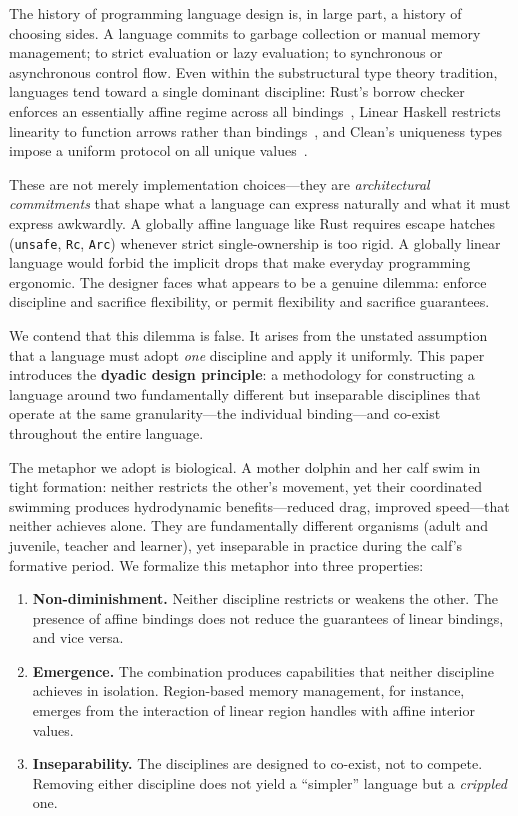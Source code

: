 \documentclass[11pt,a4paper]{article}
\begin{document}
The history of programming language design is, in large part, a history of
choosing sides. A language commits to garbage collection or manual memory
management; to strict evaluation or lazy evaluation; to synchronous or
asynchronous control flow. Even within the substructural type theory tradition,
languages tend toward a single dominant discipline: Rust's borrow checker
enforces an essentially affine regime across all bindings~\citep{jung2018rustbelt},
Linear Haskell restricts linearity to function arrows rather than
bindings~\citep{bernardy2018linear}, and Clean's uniqueness types impose a
uniform protocol on all unique values~\citep{barendsen1996uniqueness}.

These are not merely implementation choices---they are \emph{architectural
commitments} that shape what a language can express naturally and what it must
express awkwardly. A globally affine language like Rust requires escape hatches
(\lstinline{unsafe}, \lstinline{Rc}, \lstinline{Arc}) whenever strict
single-ownership is too rigid. A globally linear language would forbid the
implicit drops that make everyday programming ergonomic. The designer faces what
appears to be a genuine dilemma: enforce discipline and sacrifice flexibility,
or permit flexibility and sacrifice guarantees.

We contend that this dilemma is false. It arises from the unstated assumption
that a language must adopt \emph{one} discipline and apply it uniformly. This
paper introduces the \textbf{dyadic design principle}: a methodology for
constructing a language around two fundamentally different but inseparable
disciplines that operate at the same granularity---the individual binding---and
co-exist throughout the entire language.

The metaphor we adopt is biological. A mother dolphin and her calf swim in tight
formation: neither restricts the other's movement, yet their coordinated
swimming produces hydrodynamic benefits---reduced drag, improved speed---that
neither achieves alone. They are fundamentally different organisms (adult and
juvenile, teacher and learner), yet inseparable in practice during the calf's
formative period. We formalize this metaphor into three properties:

\begin{enumerate}[label=(\roman*)]
  \item \textbf{Non-diminishment.} Neither discipline restricts or weakens the
    other. The presence of affine bindings does not reduce the guarantees of
    linear bindings, and vice versa.
  \item \textbf{Emergence.} The combination produces capabilities that neither
    discipline achieves in isolation. Region-based memory management, for
    instance, emerges from the interaction of linear region handles with affine
    interior values.
  \item \textbf{Inseparability.} The disciplines are designed to co-exist, not
    to compete. Removing either discipline does not yield a ``simpler'' language
    but a \emph{crippled} one.
\end{enumerate}
\end{document}
